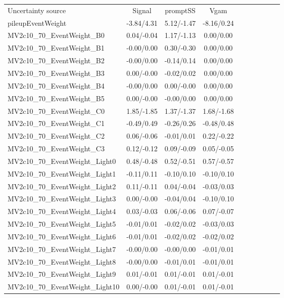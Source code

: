 \begin{table}[h]
\scriptsize
\begin{center}
\begin{tabular}{l|ccccccccc}
\hline
\hline
Uncertainty source &Signal &promptSS &Vgam \\
pileupEventWeight &-3.84/4.31 &5.12/-1.47 &-8.16/0.24 \\
MV2c10\_70\_EventWeight\_B0 &0.04/-0.04 &1.17/-1.13 &0.00/0.00 \\
MV2c10\_70\_EventWeight\_B1 &-0.00/0.00 &0.30/-0.30 &0.00/0.00 \\
MV2c10\_70\_EventWeight\_B2 &-0.00/0.00 &-0.14/0.14 &0.00/0.00 \\
MV2c10\_70\_EventWeight\_B3 &0.00/-0.00 &-0.02/0.02 &0.00/0.00 \\
MV2c10\_70\_EventWeight\_B4 &-0.00/0.00 &0.00/-0.00 &0.00/0.00 \\
MV2c10\_70\_EventWeight\_B5 &0.00/-0.00 &-0.00/0.00 &0.00/0.00 \\
MV2c10\_70\_EventWeight\_C0 &1.85/-1.85 &1.37/-1.37 &1.68/-1.68 \\
MV2c10\_70\_EventWeight\_C1 &-0.49/0.49 &-0.26/0.26 &-0.48/0.48 \\
MV2c10\_70\_EventWeight\_C2 &0.06/-0.06 &-0.01/0.01 &0.22/-0.22 \\
MV2c10\_70\_EventWeight\_C3 &0.12/-0.12 &0.09/-0.09 &0.05/-0.05 \\
MV2c10\_70\_EventWeight\_Light0 &0.48/-0.48 &0.52/-0.51 &0.57/-0.57 \\
MV2c10\_70\_EventWeight\_Light1 &-0.11/0.11 &-0.10/0.10 &-0.10/0.10 \\
MV2c10\_70\_EventWeight\_Light2 &0.11/-0.11 &0.04/-0.04 &-0.03/0.03 \\
MV2c10\_70\_EventWeight\_Light3 &0.00/-0.00 &-0.04/0.04 &-0.10/0.10 \\
MV2c10\_70\_EventWeight\_Light4 &0.03/-0.03 &0.06/-0.06 &0.07/-0.07 \\
MV2c10\_70\_EventWeight\_Light5 &-0.01/0.01 &-0.02/0.02 &-0.03/0.03 \\
MV2c10\_70\_EventWeight\_Light6 &-0.01/0.01 &-0.02/0.02 &-0.02/0.02 \\
MV2c10\_70\_EventWeight\_Light7 &-0.00/0.00 &-0.00/0.00 &-0.01/0.01 \\
MV2c10\_70\_EventWeight\_Light8 &-0.00/0.00 &-0.01/0.01 &-0.01/0.01 \\
MV2c10\_70\_EventWeight\_Light9 &0.01/-0.01 &0.01/-0.01 &0.01/-0.01 \\
MV2c10\_70\_EventWeight\_Light10 &0.00/-0.00 &0.01/-0.01 &0.01/-0.01 \\

\end{tabular}
\end{center}
\end{table}
